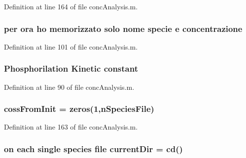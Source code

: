 Definition at line 164 of file conc\-Analysis.\-m.

\hypertarget{a00025_a5acf1fa9f8d0cb2ab8b1505ffd4dce5b}{
\subsubsection[{concentrazione}]{ per ora ho memorizzato solo nome specie e concentrazione}}\label{a00025_a5acf1fa9f8d0cb2ab8b1505ffd4dce5b}


Definition at line 101 of file conc\-Analysis.\-m.

\hypertarget{a00025_a163bb0e728c363ddfbd84725ee4bcbf1}{
\subsubsection[{constant}]{\setlength{\rightskip}{0pt plus 5cm}Phosphorilation Kinetic constant}}\label{a00025_a163bb0e728c363ddfbd84725ee4bcbf1}


Definition at line 90 of file conc\-Analysis.\-m.

\hypertarget{a00025_a547b10724f74451f717078739944cc74}{
\subsubsection[{coss\-From\-Init}]{\setlength{\rightskip}{0pt plus 5cm}coss\-From\-Init = zeros(1,n\-Species\-File)}}\label{a00025_a547b10724f74451f717078739944cc74}


Definition at line 163 of file conc\-Analysis.\-m.

\hypertarget{a00025_afb60cd67e28ca8c9fa44e4f5452589b9}{
\subsubsection[{current\-Dir}]{\setlength{\rightskip}{0pt plus 5cm}on each single {\bf species} {\bf file} current\-Dir = {\bf cd}()}}\label{a00025_afb60cd67e28ca8c9fa44e4f5452589b9}


